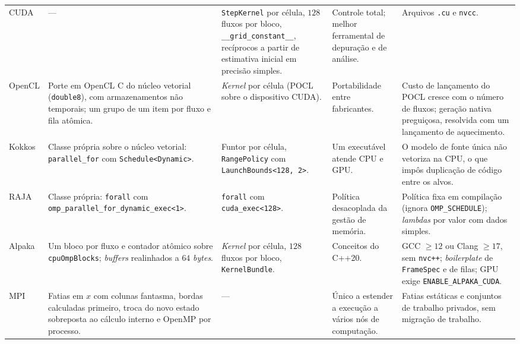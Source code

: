{\begin{longtable}{>{\raggedright\arraybackslash}p{1.7cm}>{\raggedright\arraybackslash}p{3.0cm}>{\raggedright\arraybackslash}p{2.7cm}>{\raggedright\arraybackslash}p{2.6cm}>{\raggedright\arraybackslash}p{3.7cm}}
    CUDA &
        --- &
        \texttt{StepKernel} por célula, $128$ fluxos por bloco, \texttt{\_\_grid\_\allowbreak constant\_\_}, recíprocos a partir de estimativa inicial em precisão simples. &
        Controle total; melhor ferramental de depuração e de análise. &
        Arquivos \texttt{.cu} e \texttt{nvcc}. \\
    OpenCL &
        Porte em OpenCL C do núcleo vetorial (\texttt{double8}), com armazenamentos não temporais; um grupo de um item por fluxo e fila atômica. &
        \textit{Kernel} por célula (POCL sobre o dispositivo CUDA). &
        Portabilidade entre fabricantes. &
        Custo de lançamento do POCL cresce com o número de fluxos; geração nativa preguiçosa, resolvida com um lançamento de aquecimento. \\
    Kokkos &
        Classe própria sobre o núcleo vetorial: \texttt{parallel\_for} com \texttt{Schedule<\allowbreak Dynamic>}. &
        Funtor por célula, \texttt{RangePolicy} com \texttt{Launch\allowbreak Bounds<128, 2>}. &
        Um executável atende CPU e GPU. &
        O modelo de fonte única não vetoriza na CPU, o que impôs duplicação de código entre os alvos. \\
    RAJA &
        Classe própria: \texttt{forall} com \texttt{omp\_\allowbreak parallel\_\allowbreak for\_\allowbreak dynamic\_\allowbreak exec<1>}. &
        \texttt{forall} com \texttt{cuda\_exec<128>}. &
        Política desacoplada da gestão de memória. &
        Política fixa em compilação (ignora \texttt{OMP\_SCHEDULE}); \textit{lambdas} por valor com dados simples. \\
    Alpaka &
        Um bloco por fluxo e contador atômico sobre \texttt{cpuOmpBlocks}; \textit{buffers} realinhados a $64$ \textit{bytes}. &
        \textit{Kernel} por célula, $128$ fluxos por bloco, \texttt{KernelBundle}. &
        Conceitos do C++20. &
        GCC $\ge 12$ ou Clang $\ge 17$, sem \texttt{nvc++}; \textit{boilerplate} de \texttt{FrameSpec} e de filas; GPU exige \texttt{ENABLE\_\allowbreak ALPAKA\_\allowbreak CUDA}. \\
    MPI &
        Fatias em $x$ com colunas fantasma, bordas calculadas primeiro, troca do novo estado sobreposta ao cálculo interno e OpenMP por processo. &
        --- &
        Único a estender a execução a vários nós de computação. &
        Fatias estáticas e conjuntos de trabalho privados, sem migração de trabalho. \\
\end{longtable}
}

